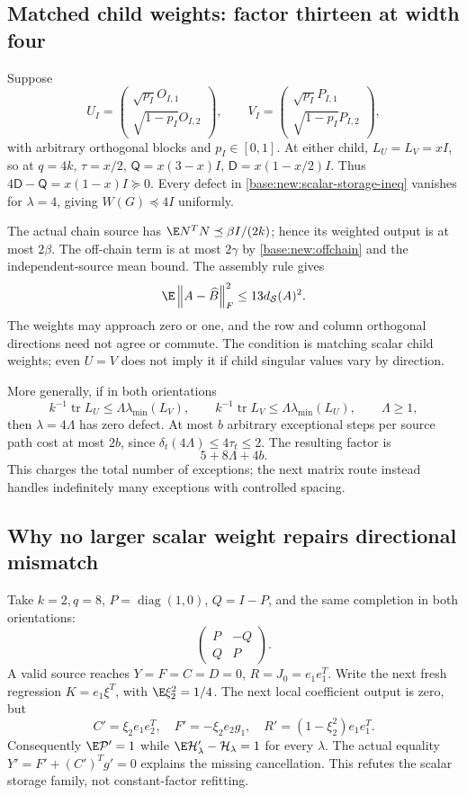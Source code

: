 \documentclass[11pt,oneside,openany,a4paper]{book}
\numberwithin{equation}{chapter}
\theoremstyle{definition}
\theoremstyle{remark}
\newcommand{\F}[1]{\left\lVert#1\right\rVert_F}
\DeclareMathOperator{\tr}{tr}\DeclareMathOperator{\rank}{rank}
\begin{document}
\subsection{Matched child weights: factor thirteen at width four}
Suppose
\[
 U_I=\begin{pmatrix}\sqrt{p_I}O_{I,1}\\\sqrt{1-p_I}O_{I,2}\end{pmatrix},\qquad
 V_I=\begin{pmatrix}\sqrt{p_I}P_{I,1}\\\sqrt{1-p_I}P_{I,2}\end{pmatrix},
\]
with arbitrary orthogonal blocks and $p_I\in[0,1]$. At either child, $L_U=L_V=xI$, so at $q=4k$,
$\tau=x/2$, $\mathsf Q=x(3-x)I$, $\mathsf D=x(1-x/2)I$. Thus
$4\mathsf D-\mathsf Q=x(1-x)I\succeq0$. Every defect in \eqref{base:new:scalar-storage-ineq} vanishes for $\lambda=4$, giving $W(G)\preceq4I$ uniformly.

The actual chain source has $\E N^TN\preceq\beta I/(2k)$; hence its weighted output is at most $2\beta$. The off-chain term is at most $2\gamma$ by \eqref{base:new:offchain} and the independent-source mean bound. The assembly rule gives
\begin{equation}\label{base:new:matched13}
 \E\F{A-\widehat B}^2\le13d_{\mathcal S}(A)^2.
\end{equation}
The weights may approach zero or one, and the row and column orthogonal directions need not agree or commute. The condition is matching scalar child weights; even $U=V$ does not imply it if child singular values vary by direction.

More generally, if in both orientations
\[
 k^{-1}\tr L_U\le\Lambda\lambda_{\min}(L_V),\qquad
 k^{-1}\tr L_V\le\Lambda\lambda_{\min}(L_U),\qquad\Lambda\ge1,
\]
then $\lambda=4\Lambda$ has zero defect. At most $b$ arbitrary exceptional steps per source path cost at most $2b$, since $\delta_t(4\Lambda)\le4\tau_t\le2$. The resulting factor is
\begin{equation}\label{base:new:exceptions}
 5+8\Lambda+4b.
\end{equation}
This charges the total number of exceptions; the next matrix route instead handles indefinitely many exceptions with controlled spacing.

\subsection{Why no larger scalar weight repairs directional mismatch}
Take $k=2,q=8$, $P=\operatorname{diag}(1,0)$, $Q=I-P$, and the same completion in both orientations:
\[
 \begin{pmatrix}P&-Q\\Q&P\end{pmatrix}.
\]
A valid source reaches $Y=F=C=D=0$, $R=J_0=e_1e_1^T$. Write the next fresh regression $K=e_1\xi^T$, with $\E\xi_2^2=1/4$. The next local coefficient output is zero, but
\[
 C'=\xi_2e_1e_2^T,\quad F'=-\xi_2e_2g_1,
 \quad R'=(1-\xi_2^2)e_1e_1^T.
\]
Consequently $\E\mathcal P'=1$ while $\E\mathcal H_\lambda'-\mathcal H_\lambda=1$ for every $\lambda$. The actual equality $Y'=F'+(C')^Tg'=0$ explains the missing cancellation. This refutes the scalar storage family, not constant-factor refitting.
\end{document}
